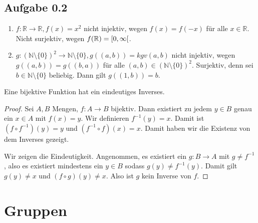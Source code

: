 \subsection*{Aufgabe 0.2}
\begin{enumerate}
\item \(f\colon \mathbb{R} \to \mathbb{R}, f(x) = x^{2}\) nicht injektiv, wegen \(f(x) =
  f(-x)\) für alle \(x \in \mathbb{R}\).  Nicht surjektiv, wegen \(f(\mathbb{R}) =
  \rinterval{0}{\infty}\).
\item
  \(g\colon (\mathbb{N} \setminus \{0\})^{2} \to \mathbb{N} \setminus \{0\}, g((a, b)) = kgv(a, b)\) nicht
  injektiv, wegen \(g((a, b)) = g((b, a))\) für alle
  \((a, b) \in (\mathbb{N} \setminus \{0\})^{2}\).  Surjektiv, denn sei \(b \in \mathbb{N}\setminus\{0\}\)
  beliebig.  Dann gilt \(g((1, b)) = b\).
\end{enumerate}
\begin{Behauptung}
  Eine bijektive Funktion hat ein eindeutiges Inverses.
\end{Behauptung}
\begin{proof}
  Sei \(A, B\) Mengen, \(f\colon A \to B\) bijektiv.  Dann existiert zu jedem
  \(y \in B\) genau ein \(x \in A\) mit \(f(x) = y\).  Wir definieren
  \(f^{-1}(y) = x\).  Damit ist \((f \circ f^{-1})(y) = y\) und \((f^{-1}
  \circ f)(x) = x\).  Damit haben wir die Existenz von dem Inverses
  gezeigt.

  Wir zeigen die Eindeutigkeit.  Angenommen, es existiert ein \(g\colon B
  \to A\) mit \(g \ne f^{-1}\), also es existiert mindestens ein \(y \in B\)
  sodass \(g(y) \ne f^{-1}(y)\).  Damit gilt \(g(y) \ne x\) und \((f \circ
  g)(y) \ne x \).  Also ist \(g\) kein Inverse von \(f\).
\end{proof}
\section*{Gruppen}
